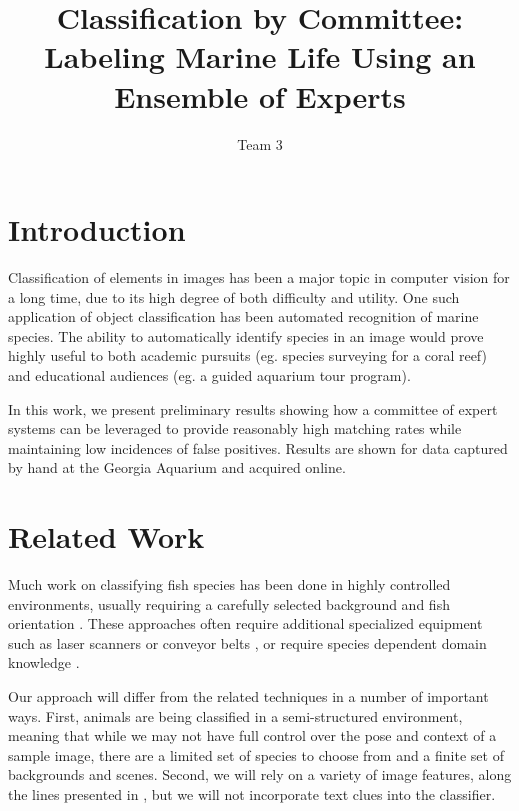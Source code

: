 \documentclass[10pt,twocolumn,letterpaper]{article}
\begin{document}
\title{Classification by Committee: \\ Labeling Marine Life Using an Ensemble of Experts}


\author{Team 3}

\maketitle


\section{Introduction}
 Classification of elements in images has been a major topic in computer vision for a long time, due to its high degree of both difficulty and utility.
 One such application of object classification has been automated recognition of marine species.
 The ability to automatically identify species in an image would prove highly useful to both academic pursuits (eg. species surveying for a coral reef) and educational audiences (eg. a guided aquarium tour program).
 
 In this work, we present preliminary results showing how a committee of expert systems can be leveraged to provide reasonably high matching rates while maintaining low incidences of false positives. Results are shown for data captured by hand at the Georgia Aquarium and acquired online.

\section{Related Work}
 Much work on classifying fish species has been done in highly controlled environments, usually requiring a carefully selected background and fish orientation \cite{white2006automated}.
 These approaches often require additional specialized equipment such as laser scanners or conveyor belts \cite{storbeck2001fish}, or require species dependent domain knowledge \cite{thonnat1988expert}.
  
  Our approach will differ from the related techniques in a number of important ways.
  First, animals are being classified in a semi-structured environment, meaning that while we may not have full control over the pose and context of a sample image, there are a limited set of species to choose from and a finite set of backgrounds and scenes.
  Second, we will rely on a variety of image features, along the lines presented in \cite{berg2006animals}, but we will not incorporate text clues into the classifier.
\end{document}
